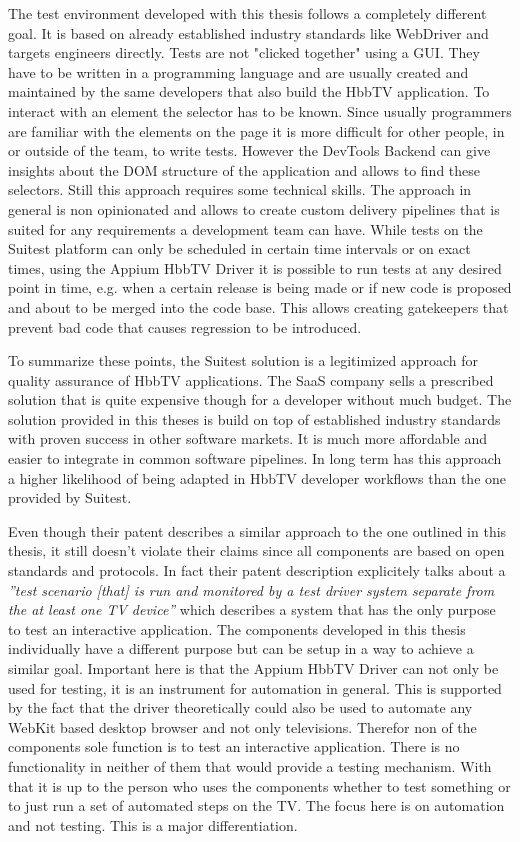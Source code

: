The test environment developed with this thesis follows a completely different goal. It is based on already established industry standards like WebDriver and targets engineers directly. Tests are not "clicked together" using a GUI. They have to be written in a programming language and are usually created and maintained by the same developers that also build the HbbTV application. To interact with an element the selector has to be known. Since usually programmers are familiar with the elements on the page it is more difficult for other people, in or outside of the team, to write tests. However the DevTools Backend can give insights about the DOM structure of the application and allows to find these selectors. Still this approach requires some technical skills. The approach in general is non opinionated and allows to create custom delivery pipelines that is suited for any requirements a development team can have. While tests on the Suitest platform can only be scheduled in certain time intervals or on exact times, using the Appium HbbTV Driver it is possible to run tests at any desired point in time, e.g. when a certain release is being made or if new code is proposed and about to be merged into the code base. This allows creating gatekeepers that prevent bad code that causes regression to be introduced.

To summarize these points, the Suitest solution is a legitimized approach for quality assurance of HbbTV applications. The SaaS company sells a prescribed solution that is quite expensive though for a developer without much budget. The solution provided in this theses is build on top of established industry standards with proven success in other software markets. It is much more affordable and easier to integrate in common software pipelines. In long term has this approach a higher likelihood of being adapted in HbbTV developer workflows than the one provided by Suitest.

Even though their patent describes a similar approach to the one outlined in this thesis, it still doesn't violate their claims since all components are based on open standards and protocols. In fact their patent description explicitely talks about a \textit{''test scenario [that] is run and monitored by a test driver system separate from the at least one TV device''} \cite{krocek2016method} which describes a system that has the only purpose to test an interactive application. The components developed in this thesis individually have a different purpose but can be setup in a way to achieve a similar goal. Important here is that the Appium HbbTV Driver can not only be used for testing, it is an instrument for automation in general. This is supported by the fact that the driver theoretically could also be used to automate any WebKit based desktop browser and not only televisions. Therefor non of the components sole function is to test an interactive application. There is no functionality in neither of them that would provide a testing mechanism. With that it is up to the person who uses the components whether to test something or to just run a set of automated steps on the TV. The focus here is on automation and not testing. This is a major differentiation.
